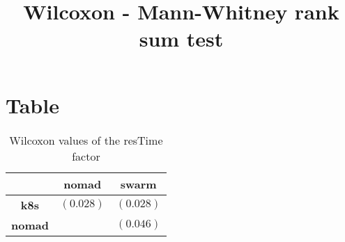 \documentclass{article}
\title{Wilcoxon - Mann-Whitney rank sum test}
\author{}
\begin{document}
\maketitle
\section{Table}
\begin{table}[!htp]
  \caption{Wilcoxon values of the resTime factor}
  \label{table:resTime}
  \centering
  \begin{scriptsize}
  \begin{tabular}{c|cc}
      & \textbf{nomad} & \textbf{swarm} \\\hline
      \textbf{k8s} & $(0.028) $ & $ (0.028)$ \\
      \textbf{nomad} & $ $ & $ (0.046)$ \\
  \end{tabular}
  \end{scriptsize}
\end{table}
\end{document}
